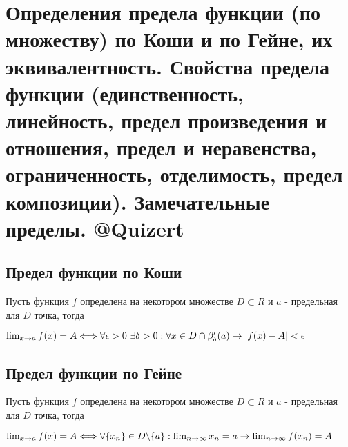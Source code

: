 \documentclass[12pt]{article}
\begin{document}
\section{Определения предела функции (по множеству) по Коши и по Гейне, их эквивалентность. Свойства предела функции (единственность, линейность, предел произведения и отношения, предел и неравенства, ограниченность, отделимость, предел композиции). Замечательные пределы. @Quizert}
\subsection{Предел функции по Коши}
Пусть функция $f$ определена на некотором множестве $D \subset R$ и $a $ - предельная для $D$ точка, тогда
\begin{center}
$\lim_{x \to a} f(x) = A \Longleftrightarrow \\ \forall \epsilon > 0 \ \exists \delta > 0: \forall x \in D \cap \beta'_{\delta}(a) \to |f(x) - A | < \epsilon$
\end{center}
\subsection{Предел функции по Гейне}
Пусть функция $f$ определена на некотором множестве $D \subset R$ и $a $ - предельная для $D$ точка, тогда
\begin{center}
$\lim_{x \to a} f(x) = A \Longleftrightarrow \\ \forall \{x_n\} \in D \backslash \{a\} :\lim_{n \to \infty}x_n = a \to \lim_{n\to \infty} f(x_n) = A$
\end{center}
\end{document}
